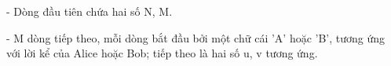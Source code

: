 - Dòng đầu tiên chứa hai số N, M.   


   - M dòng tiếp theo, mỗi dòng bắt đầu bởi một chữ cái 'A' hoặc 'B', tương ứng với lời kể của Alice hoặc Bob; tiếp theo là hai số u, v tương ứng.